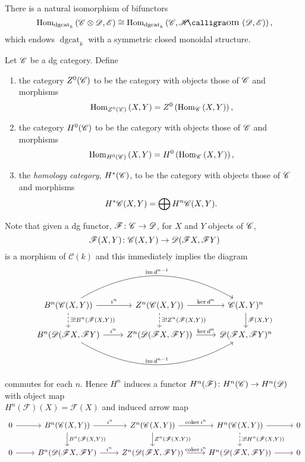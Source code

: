 \documentclass[dissertation.tex]{subfiles}
\begin{document}
\begin{rmk}
  There is a natural isomorphism of bifunctors
  $$\Hom{\operatorname{dgcat}_k}{\CC \otimes \D, \mathscr{E}} \cong \Hom{\operatorname{dgcat}_k}{\CC, \SHom{\D,\mathscr{E}}},$$
  which endows $\operatorname{dgcat}_k$ with a symmetric closed monoidal structure.
\end{rmk}

\begin{defn}
  Let $\mathscr{C}$ be a dg category.
  Define
  \begin{enumerate}
  \item
    the category $Z^0(\mathscr{C})$ to be the category with objects those of $\mathscr{C}$ and morphisms
    $$\operatorname{Hom}_{Z^0(\mathscr{C})}\left(X,Y\right) = Z^0\left(\operatorname{Hom}_{\mathscr{C}}\left(X,Y\right)\right),$$
  \item
    the category $H^0(\mathscr{C})$ to be the category with objects those of $\mathscr{C}$ and morphisms
    $$\operatorname{Hom}_{H^0(\mathscr{C})}\left(X,Y\right) = H^0\left(\operatorname{Hom}_{\mathscr{C}}\left(X,Y\right)\right),$$
  \item
    the {\it homology category}, $H^\ast(\mathscr{C})$, to be the category with objects those of $\mathscr{C}$ and morphisms 
    $$H^\ast\mathscr{C}(X,Y) = \bigoplus H^n\mathscr{C}(X,Y).$$
  \end{enumerate}
\end{defn}

\begin{rmk}\label{DGInducedHomology}
  Note that given a dg functor, $\mathscr{F} \colon \mathscr{C} \rightarrow \mathscr{D}$, for $X$ and $Y$ objects of $\mathscr{C}$, 
  $$\mathscr{F}(X,Y) \colon \mathscr{C}(X,Y) \rightarrow \mathscr{D}(\mathscr{F}X, \mathscr{F}Y)$$
  is a morphism of $\mathcal{C}(k)$ and this immediately implies the diagram
  $$\begin{tikzcd}
    B^n(\CC(X,Y))\arrow{r}{\imath^n}\arrow[bend left]{rr}{\im d^{n-1}}\arrow[dashed]{d}{\exists !B^n(\F(X,Y))} & Z^n(\CC(X,Y)) \arrow{r}{\ker d^n}\arrow[dashed]{d}{\exists !Z^n(\F(X,Y))} & \CC(X,Y)^{n} \arrow{d}{\F(X,Y)}\\
    B^n(\D(\F X,\F Y) \arrow{r}{\imath^n}\arrow[bend right]{rr}{\im d^{n-1}} & Z^n(\D(\F X,\F Y))\arrow{r}{\ker d^n} & \D(\F X,\F Y)^{n}
  \end{tikzcd}$$
  commutes for each $n$.
  Hence $H^n$ induces a functor
  $H^n(\mathscr{F}) \colon H^n(\mathscr{C}) \rightarrow H^n(\mathscr{D})$
  with object map\\ $H^n(\mathscr{F})(X) = \mathscr{F}(X)$ and induced arrow map 
  $$\begin{tikzcd}
    0 \arrow{r} & B^n(\CC(X,Y))\arrow{r}{\imath^n}\arrow{d}{B^n(\F(X,Y))} & Z^n(\CC(X,Y)) \arrow{r}{\coker \imath^n}\arrow{d}{Z^n(\F(X,Y))} & H^n(\CC(X,Y)) \arrow[dashed]{d}{\exists !H^n(\F(X,Y))}\arrow{r} & 0 \\
    0 \arrow{r} & B^n(\D(\F X,\F Y) \arrow{r}{\imath^n} & Z^n(\D(\F X,\F Y))\arrow{r}{\coker \imath^n} & H^n(\D(\F X,\F Y)) \arrow{r} & 0
  \end{tikzcd}$$
\end{rmk}
\end{document}
